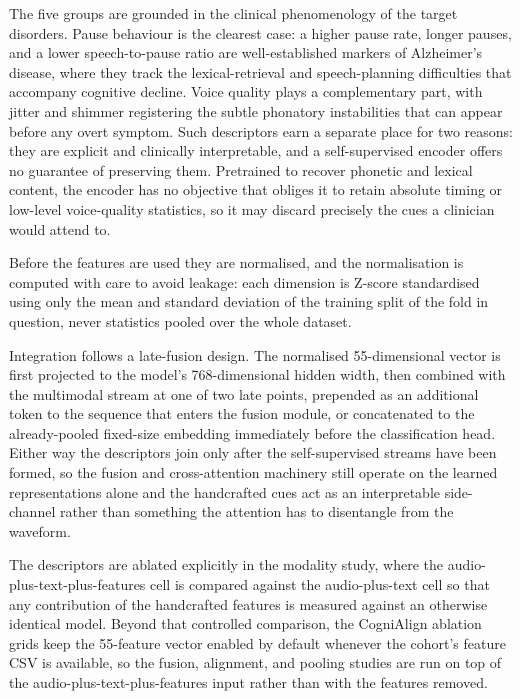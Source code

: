 \documentclass[a4paper,12pt]{article}
\begin{document}
The five groups are grounded in the clinical phenomenology of the target disorders. Pause behaviour is the clearest case: a higher pause rate, longer pauses, and a lower speech-to-pause ratio are well-established markers of Alzheimer's disease, where they track the lexical-retrieval and speech-planning difficulties that accompany cognitive decline. Voice quality plays a complementary part, with jitter and shimmer registering the subtle phonatory instabilities that can appear before any overt symptom. Such descriptors earn a separate place for two reasons: they are explicit and clinically interpretable, and a self-supervised encoder offers no guarantee of preserving them. Pretrained to recover phonetic and lexical content, the encoder has no objective that obliges it to retain absolute timing or low-level voice-quality statistics, so it may discard precisely the cues a clinician would attend to.

Before the features are used they are normalised, and the normalisation is computed with care to avoid leakage: each dimension is Z-score standardised using only the mean and standard deviation of the training split of the fold in question, never statistics pooled over the whole dataset.

Integration follows a late-fusion design. The normalised 55-dimensional vector is first projected to the model's 768-dimensional hidden width, then combined with the multimodal stream at one of two late points, prepended as an additional token to the sequence that enters the fusion module, or concatenated to the already-pooled fixed-size embedding immediately before the classification head. Either way the descriptors join only after the self-supervised streams have been formed, so the fusion and cross-attention machinery still operate on the learned representations alone and the handcrafted cues act as an interpretable side-channel rather than something the attention has to disentangle from the waveform.

The descriptors are ablated explicitly in the modality study, where the audio-plus-text-plus-features cell is compared against the audio-plus-text cell so that any contribution of the handcrafted features is measured against an otherwise identical model. Beyond that controlled comparison, the CogniAlign ablation grids keep the 55-feature vector enabled by default whenever the cohort's feature CSV is available, so the fusion, alignment, and pooling studies are run on top of the audio-plus-text-plus-features input rather than with the features removed.
\end{document}
